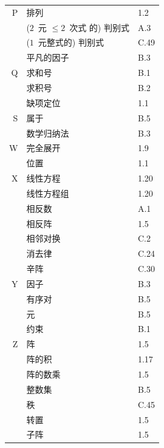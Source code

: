 \documentclass[../libro.tex]{subfiles}
\begin{document}
\begin{longtable}[c]{rll}
    P  & 排列                       & 1.2  \\
    {} & (\(2\)~元 \({\leq} 2\)~次式%
    的) 判别式  & A.3  \\
    {} & (\(1\)~元整式的) 判别式         & C.49 \\
    {} & 平凡的因子                    & B.3  \\

    Q  & 求和号                      & B.1  \\
    {} & 求积号                      & B.2  \\
    {} & 缺项定位                     & 1.1  \\

    S  & 属于                       & B.5  \\
    {} & 数学归纳法                    & B.3  \\

    W  & 完全展开                     & 1.9  \\
    {} & 位置                       & 1.1  \\

    X  & 线性方程                     & 1.20 \\
    {} & 线性方程组                    & 1.20 \\
    {} & 相反数                      & A.1  \\
    {} & 相反阵                      & 1.5  \\
    {} & 相邻对换                     & C.2  \\
    {} & 消去律                      & C.24 \\
    {} & 辛阵                       & C.30 \\

    Y  & 因子                       & B.3  \\
    {} & 有序对                      & B.5  \\
    {} & 元                        & B.5  \\
    {} & 约束                       & B.1  \\

    Z  & 阵                        & 1.5  \\
    {} & 阵的积                      & 1.17 \\
    {} & 阵的数乘                     & 1.5  \\
    {} & 整数集                      & B.5  \\
    {} & 秩                        & C.45 \\
    {} & 转置                       & 1.5  \\
    {} & 子阵                       & 1.5  \\
\end{longtable}
\end{document}
